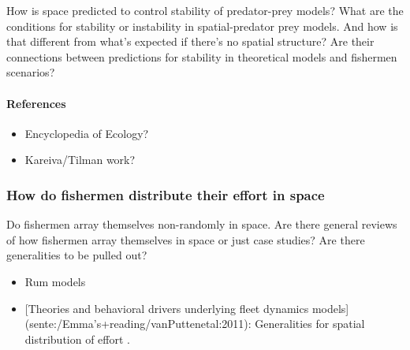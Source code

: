 \documentclass[]{article}
\begin{document}
How is space predicted to control stability of predator-prey models?
What are the conditions for stability or instability in spatial-predator
prey models. And how is that different from what's expected if there's
no spatial structure? Are their connections between predictions for
stability in theoretical models and fishermen scenarios?

\paragraph{References}

\begin{itemize}
\itemsep1pt\parskip0pt
\item
  Encyclopedia of Ecology?
\item
  Kareiva/Tilman work?
\end{itemize}

\subsubsection{How do fishermen distribute their effort in space}

Do fishermen array themselves non-randomly in space. Are there general
reviews of how fishermen array themselves in space or just case studies?
Are there generalities to be pulled out?

\begin{itemize}
\itemsep1pt\parskip0pt
\item
  Rum models
\item
  {[}Theories and behavioral drivers underlying fleet dynamics
  models{]}(sente:/Emma's+reading/vanPuttenetal:2011): Generalities for
  spatial distribution of effort \citet{vanPuttenetal2011}.
\end{itemize}


\end{document}
